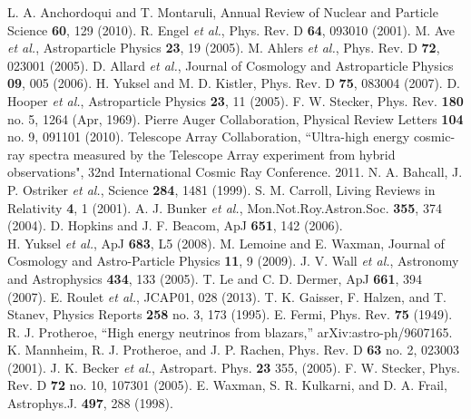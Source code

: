 \begin{thebibliography}{1}
 L. A. Anchordoqui and T. Montaruli, Annual Review of Nuclear and Particle Science \textbf{60}, 129 (2010).
 R. Engel {\it et al.}, Phys. Rev. D \textbf{64}, 093010 (2001).
 M. Ave {\it et al.}, Astroparticle Physics \textbf{23}, 19 (2005).
 M. Ahlers {\it et al.}, Phys. Rev. D \textbf{72},  023001 (2005).
  D. Allard {\it et al.}, Journal of Cosmology and Astroparticle Physics \textbf{09},  005 (2006).
H. Yuksel and M. D. Kistler, Phys. Rev. D \textbf{75}, 083004 (2007).
 D. Hooper {\it et al.}, Astroparticle Physics \textbf{23}, 11 (2005).
 F. W. Stecker, Phys. Rev. \textbf{180} no. 5, 1264 (Apr, 1969).
 Pierre Auger Collaboration, Physical Review Letters \textbf{104} no. 9, 091101 (2010).
 Telescope Array Collaboration, 
``Ultra-high energy cosmic-ray spectra measured by the Telescope Array experiment from hybrid observations", 
32nd International Cosmic Ray Conference. 2011.
 N. A. Bahcall, J. P. Ostriker {\it et al.}, Science \textbf{284}, 1481 (1999).
 S. M. Carroll, Living Reviews in Relativity \textbf{4}, 1 (2001).
 A. J. Bunker {\it et al.}, Mon.Not.Roy.Astron.Soc. \textbf{355}, 374 (2004).
 D. Hopkins and J. F. Beacom, ApJ \textbf{651}, 142 (2006).\\
H. Yuksel {\it et al.}, ApJ \textbf{683}, L5 (2008).
 M. Lemoine and E. Waxman, Journal of Cosmology and Astro-Particle Physics \textbf{11}, 9 (2009).
 J. V. Wall {\it et al.}, Astronomy and Astrophysics \textbf{434}, 133 (2005).
 T. Le and C. D. Dermer, ApJ \textbf{661}, 394 (2007).
 E. Roulet {\it et al.}, JCAP01, 028 (2013).
  T. K. Gaisser, F. Halzen, and T. Stanev, Physics Reports \textbf{258} no. 3, 173 (1995).
 E. Fermi, Phys. Rev. \textbf{75} (1949).
 R. J. Protheroe, “High energy neutrinos from blazars,” arXiv:astro-ph/9607165.
  K. Mannheim, R. J. Protheroe, and J. P. Rachen,  Phys. Rev. D \textbf{63} no. 2, 023003 (2001).
  J. K. Becker {\it et al.}, Astropart. Phys. \textbf{23} 355, (2005).
 F. W. Stecker, Phys. Rev. D \textbf{72} no. 10,  107301 (2005).
 E. Waxman, S. R. Kulkarni, and D. A. Frail,  Astrophys.J. \textbf{497}, 288 (1998).

\end{thebibliography}
